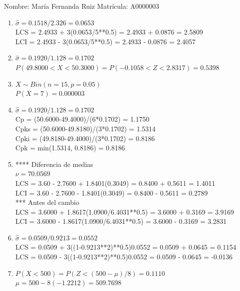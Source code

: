 \documentclass[8pt]{report}
\begin{document}
 \newpage

Nombre: \underline{\hspace*{.2in}}
María Fernanda Ruiz
\underline{\hspace*{.2in}} \quad Matr\'icula:\underline{\hspace*{.2in}}
A0000003
\underline{\hspace*{.2in}} \\

\begin{enumerate}
\item $\hat\sigma = 0.1518/2.326 = 0.0653$\\
LCS = 2.4933 + 3(0.0653/5**0.5) = 2.4933 + 0.0876 = 2.5809\\
LCI = 2.4933 - 3(0.0653/5**0.5) = 2.4933 - 0.0876 = 2.4057
\item $\hat\sigma = 0.1920/1.128 = 0.1702$\\
$P(49.8000 < X < 50.3000) = P(-0.1058 < Z < 2.8317) = 0.5398$\\
\item $X \sim Bin(n=15, p=0.05)$\\
$P(X = 7) = 0.000003$
\item $\hat\sigma = 0.1920/1.128 = 0.1702$\\
Cp = (50.6000-49.4000)/(6*0.1702) = 1.1750\\
Cpks = (50.6000-49.8180)/(3*0.1702) = 1.5314\\
Cpki = (49.8180-49.4000)/(3*0.1702) = 0.8186\\
Cpk = min(1.5314, 0.8186) = 0.8186
\item **** Diferencia de medias\\
$\nu = 70.0569$\\
LCS = 3.60 - 2.7600 + 1.8401(0.3049) = 0.8400 + 0.5611 = 1.4011\\
LCI = 3.60 - 2.7600 - 1.8401(0.3049) = 0.8400 - 0.5611 = 0.2789\\
*** Antes del cambio\\
LCS = 3.6000 + 1.8617(1.0900/6.4031**0.5) = 3.6000 + 0.3169 = 3.9169\\
LCI = 3.6000 - 1.8617(1.0900/6.4031**0.5) = 3.6000 - 0.3169 = 3.2831\\
\item $\hat\sigma = 0.0509/0.9213 = 0.0552$\\
LCS = 0.0509 + 3((1-0.9213**2)**0.5)0.0552 = 0.0509 + 0.0645 = 0.1154\\
LCS = 0.0509 - 3((1-0.9213**2)**0.5)0.0552 = 0.0509 - 0.0645 = -0.0136
\item $P(X < 500) = P(Z < (500-\mu)/8) = 0.1110$\\
$\mu = 500 - 8(-1.2212) = 509.7698$\\
\end{enumerate}
\end{document}
